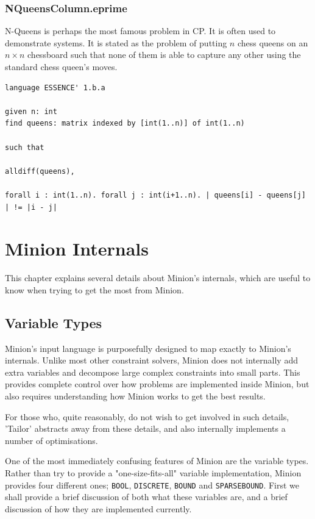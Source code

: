 \documentclass[oneside]{book}
\newcommand{\BOOL}{\texttt{BOOL}\xspace}
\newcommand{\DISCRETE}{\texttt{DISCRETE}\xspace}
\newcommand{\BOUND}{\texttt{BOUND}\xspace}
\newcommand{\SPARSEBOUND}{\texttt{SPARSEBOUND}\xspace}
\begin{document}
\subsection{NQueensColumn.eprime}\label{sect:nqueens}
N-Queens is perhaps the most famous problem in CP. It is often used to demonstrate systems. It is stated as  the problem of putting $n$ chess queens on an $n \times n$ chessboard such that none of them is able to capture any other using the standard chess queen's moves.
\begin{verbatim}
language ESSENCE' 1.b.a

given n: int
find queens: matrix indexed by [int(1..n)] of int(1..n)

such that

alldiff(queens),

forall i : int(1..n). forall j : int(i+1..n). | queens[i] - queens[j] | != |i - j|
\end{verbatim}

\chapter{Minion Internals}

This chapter explains several details about Minion's internals, which are useful to know when trying to get the most from Minion.

\section{Variable Types}

Minion's input language is purposefully designed to map exactly to Minion's internals. Unlike most other constraint solvers, Minion does not internally add extra variables and decompose large complex constraints into small parts. This provides complete control over how problems are implemented inside Minion, but also requires understanding how Minion works to get the best results.

For those who, quite reasonably, do not wish to get involved in such details, 'Tailor' abstracts away from these details, and also internally implements a number of optimisations.

One of the most immediately confusing features of Minion are the variable types. Rather than try to provide a "one-size-fits-all" variable implementation, Minion provides four different ones; \BOOL, \DISCRETE, \BOUND and \SPARSEBOUND.  First we shall provide a brief discussion of both what these variables are, and a brief discussion of how they are implemented currently.
\end{document}
